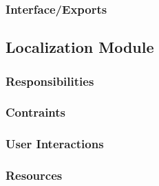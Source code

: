 \subsubsection{Interface/Exports}
\label{sec:exports}

\subsection{Localization Module}
\label{sec:localization_design}

\subsubsection{Responsibilities}
\label{sec:responsibilities}

\subsubsection{Contraints}
\label{sec:constraints}

\subsubsection{User Interactions}
\label{sec:interactions}

\subsubsection{Resources}
\label{sec:resources}

